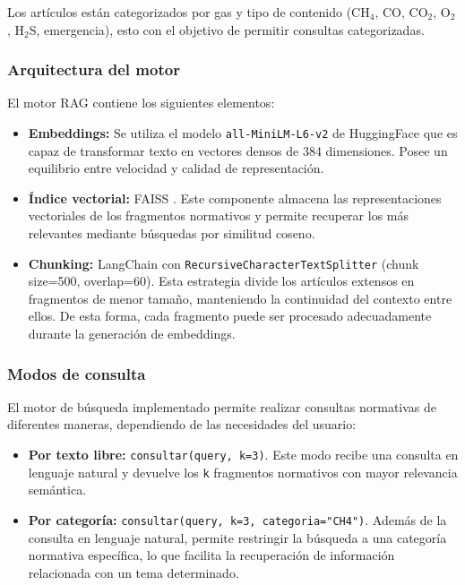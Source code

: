 \documentclass[journal,onecolumn]{IEEEtran}
\begin{document}
Los artículos están categorizados por gas y tipo de contenido (CH$_4$, CO, CO$_2$, O$_2$, H$_2$S, emergencia), esto con el objetivo de permitir consultas categorizadas.

\subsubsection{Arquitectura del motor}
El motor RAG contiene los siguientes elementos:
\begin{itemize}
    \item \textbf{Embeddings:} Se utiliza el modelo \texttt{all-MiniLM-L6-v2} de HuggingFace que  es capaz de transformar texto en vectores densos de 384 dimensiones. Posee un equilibrio entre velocidad y calidad de representación.
     \item \textbf{Índice vectorial:} FAISS \cite{johnson2019}. Este componente almacena las representaciones vectoriales de los fragmentos normativos y permite recuperar los más relevantes mediante búsquedas por similitud coseno. 
    \item \textbf{Chunking:} LangChain con \texttt{RecursiveCharacterTextSplitter} (chunk size=500, overlap=60). Esta estrategia divide los artículos extensos en fragmentos de menor tamaño, manteniendo la continuidad del contexto entre ellos. De esta forma, cada fragmento puede ser procesado adecuadamente durante la generación de embeddings.
\end{itemize}

\subsubsection{Modos de consulta}

El motor de búsqueda implementado permite realizar consultas normativas de diferentes maneras, dependiendo de las necesidades del usuario:

\begin{itemize}
    \item \textbf{Por texto libre:} \texttt{consultar(query, k=3)}. Este modo recibe una consulta en lenguaje natural y devuelve los \texttt{k} fragmentos normativos con mayor relevancia semántica.
    \item \textbf{Por categoría:} \texttt{consultar(query, k=3, categoria="CH4")}. Además de la consulta en lenguaje natural, permite restringir la búsqueda a una categoría normativa específica, lo que facilita la recuperación de información relacionada con un tema determinado.
\end{itemize}
\end{document}

